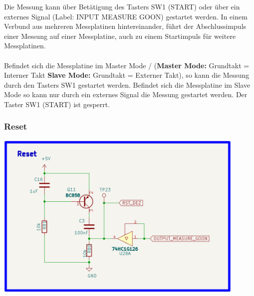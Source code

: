 Die Messung kann über Betätigung des Tasters SW1 (START) oder über ein externes Signal (Label: INPUT MEASURE GOON) gestartet werden. In einem Verbund aus mehreren Messplatinen hintereinander, führt der Abschlussimpuls einer Messung auf einer Messplatine, auch zu einem Startimpuls für weitere Messplatinen.
\\
\\ 
Befindet sich die Messplatine im \glqq Master Mode / \grqq{} (\textbf{Master Mode:}  Grundtakt = Interner Takt \textbf{Slave Mode:} Grundtakt = Externer Takt), so kann die Messung durch den Tasters SW1 gestartet werden. Befindet sich die Messplatine im \glqq Slave Mode \grqq{} so kann nur durch ein externes Signal die Messung gestartet werden. Der Taster SW1 (START) ist gesperrt.

\newpage
\subsubsection{Reset}

\begin{center}
\includegraphics[width=12cm]{Bilder/Reset.png}
\end{center}

